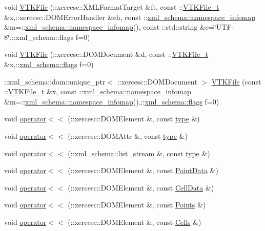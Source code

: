 \begin{DoxyCompactItemize}
\item 
void \hyperlink{vtk-unstructured_8h_a17e56f868a66a9d51965eb2697b37ca0}{V\+T\+K\+File} (\+::xercesc\+::\+X\+M\+L\+Format\+Target \&ft, const \+::\hyperlink{classVTKFile__t}{V\+T\+K\+File\+\_\+t} \&x,\+::xercesc\+::\+D\+O\+M\+Error\+Handler \&eh, const \+::\hyperlink{namespacexml__schema_a17712c8260e03226f0a9e4d21ab78f42}{xml\+\_\+schema\+::namespace\+\_\+infomap} \&m=\+::\hyperlink{namespacexml__schema_a17712c8260e03226f0a9e4d21ab78f42}{xml\+\_\+schema\+::namespace\+\_\+infomap}(), const \+::std\+::string \&e=\char`\"{}U\+TF-\/8\char`\"{},\+::xml\+\_\+schema\+::flags f=0)
\item 
void \hyperlink{vtk-unstructured_8h_a565e24ae1c887b385f78f07e149688fc}{V\+T\+K\+File} (\+::xercesc\+::\+D\+O\+M\+Document \&d, const \+::\hyperlink{classVTKFile__t}{V\+T\+K\+File\+\_\+t} \&x,\+::\hyperlink{namespacexml__schema_a0612287d030cb2732d31a45b258fdc87}{xml\+\_\+schema\+::flags} f=0)
\item 
\+::xml\+\_\+schema\+::dom\+::unique\+\_\+ptr$<$ \+::xercesc\+::\+D\+O\+M\+Document $>$ \hyperlink{vtk-unstructured_8h_a0aebc495adbcc40198f54babc0d4fcbc}{V\+T\+K\+File} (const \+::\hyperlink{classVTKFile__t}{V\+T\+K\+File\+\_\+t} \&x, const \+::\hyperlink{namespacexml__schema_a17712c8260e03226f0a9e4d21ab78f42}{xml\+\_\+schema\+::namespace\+\_\+infomap} \&m=\+::\hyperlink{namespacexml__schema_a17712c8260e03226f0a9e4d21ab78f42}{xml\+\_\+schema\+::namespace\+\_\+infomap}(),\+::\hyperlink{namespacexml__schema_a0612287d030cb2732d31a45b258fdc87}{xml\+\_\+schema\+::flags} f=0)
\item 
void \hyperlink{vtk-unstructured_8h_af854f7b8e374accb10ab81c733522d94}{operator$<$$<$} (\+::xercesc\+::\+D\+O\+M\+Element \&, const \hyperlink{classtype}{type} \&)
\item 
void \hyperlink{vtk-unstructured_8h_a2be5209924ae2f707167fe61b493efe7}{operator$<$$<$} (\+::xercesc\+::\+D\+O\+M\+Attr \&, const \hyperlink{classtype}{type} \&)
\item 
void \hyperlink{vtk-unstructured_8h_a592b2e850332ad8580bb7fbdbdf3405b}{operator$<$$<$} (\+::\hyperlink{namespacexml__schema_a840728106ddd08800e62729d4eddbbc8}{xml\+\_\+schema\+::list\+\_\+stream} \&, const \hyperlink{classtype}{type} \&)
\item 
void \hyperlink{vtk-unstructured_8h_adcc12b50e7eec96e51069960ff490aec}{operator$<$$<$} (\+::xercesc\+::\+D\+O\+M\+Element \&, const \hyperlink{classPointData}{Point\+Data} \&)
\item 
void \hyperlink{vtk-unstructured_8h_ad7d5540bd93e9ed92be18cb521501e0a}{operator$<$$<$} (\+::xercesc\+::\+D\+O\+M\+Element \&, const \hyperlink{classCellData}{Cell\+Data} \&)
\item 
void \hyperlink{vtk-unstructured_8h_ad157bfbf3a7da32268c50c8133d349f7}{operator$<$$<$} (\+::xercesc\+::\+D\+O\+M\+Element \&, const \hyperlink{classPoints}{Points} \&)
\item 
void \hyperlink{vtk-unstructured_8h_a71c62a435e60069931c8d51f1eaed6db}{operator$<$$<$} (\+::xercesc\+::\+D\+O\+M\+Element \&, const \hyperlink{classCells}{Cells} \&)
\end{DoxyCompactItemize}


